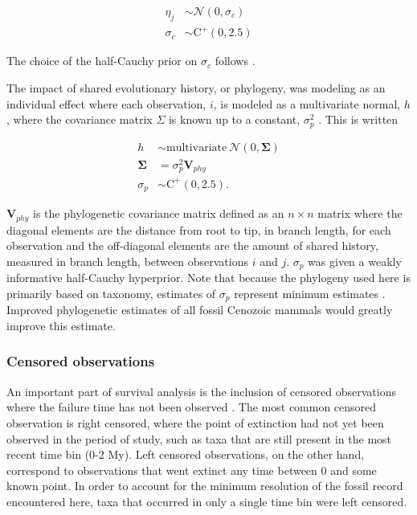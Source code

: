 \documentclass{article}
\begin{document}
\begin{align*}
  \eta_{j} &\sim \mathcal{N}(0, \sigma_{c}) \\
  \sigma_{c} &\sim \mathrm{C}^{+}(0, 2.5)
\end{align*}

The choice of the half-Cauchy prior on \(\sigma_{c}\) follows \cite{Gelman2006a}.

The impact of shared evolutionary history, or phylogeny, was modeling as an individual effect where each observation, \(i\), is modeled as a multivariate normal, \(h\), where the covariance matrix \(\Sigma\) is known up to a constant, \(\sigma_{p}^{2}\) \cite{Lynch1991,Housworth2004}. This is written

\begin{align*}
  h &\sim \mathrm{multivariate\ }\mathcal{N}(0, \mathbf{\Sigma}) \\
  \mathbf{\Sigma} &= \sigma_{p}^{2} \mathbf{V}_{phy} \\
  \sigma_{p} &\sim \mathrm{C}^{+}(0, 2.5).
\end{align*}

\(\mathbf{V}_{phy}\) is the phylogenetic covariance matrix defined as an \(n \times n\) matrix where the diagonal elements are the distance from root to tip, in branch length, for each observation and the off-diagonal elements are the amount of shared history, measured in branch length, between observations \(i\) and \(j\). \(\sigma_{p}\) was given a weakly informative half-Cauchy hyperprior. Note that because the phylogeny used here is primarily based on taxonomy, estimates of \(\sigma_{p}\) represent minimum estimates \cite{Lynch1991,Housworth2004}. Improved phylogenetic estimates of all fossil Cenozoic mammals would greatly improve this estimate.


\subsubsection{Censored observations} \label{sec:censor}

An important part of survival analysis is the inclusion of censored observations where the failure time has not been observed \cite{Ibrahim2001,Klein2003}. The most common censored observation is right censored, where the point of extinction had not yet been observed in the period of study, such as taxa that are still present in the most recent time bin (0-2 My). Left censored observations, on the other hand, correspond to observations that went extinct any time between 0 and some known point. In order to account for the minimum resolution of the fossil record encountered here, taxa that occurred in only a single time bin were left censored.
\end{document}
